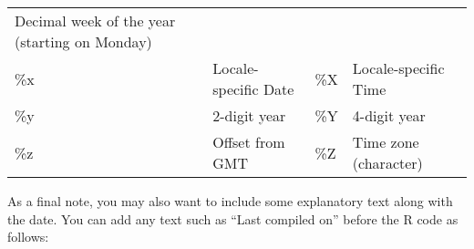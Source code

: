 \documentclass[
  11pt,
]{krantz}
\newenvironment{Shaded}{\begin{snugshade}}{\end{snugshade}}
\newcommand{\AttributeTok}[1]{\textcolor[rgb]{0.61,0.61,0.61}{#1}}
\newcommand{\FunctionTok}[1]{\textcolor[rgb]{0,0,0}{#1}}
\newcommand{\KeywordTok}[1]{\textcolor[rgb]{0.27,0.27,0.27}{\textbf{#1}}}
\newcommand{\StringTok}[1]{\textcolor[rgb]{0.5,0.5,0.5}{#1}}
\begin{document}
\begin{table}
\begin{tabular}{llll}
\begin{minipage}[t]{0.47\columnwidth}
Decimal week of the year (starting on Monday)\strut
\end{minipage}\tabularnewline
\begin{minipage}[t]{0.05\columnwidth}\raggedright
\%x\strut
\end{minipage} & \begin{minipage}[t]{0.31\columnwidth}\raggedright
Locale-specific Date\strut
\end{minipage} & \begin{minipage}[t]{0.05\columnwidth}\raggedright
\%X\strut
\end{minipage} & \begin{minipage}[t]{0.47\columnwidth}\raggedright
Locale-specific Time\strut
\end{minipage}\tabularnewline
\begin{minipage}[t]{0.05\columnwidth}\raggedright
\%y\strut
\end{minipage} & \begin{minipage}[t]{0.31\columnwidth}\raggedright
2-digit year\strut
\end{minipage} & \begin{minipage}[t]{0.05\columnwidth}\raggedright
\%Y\strut
\end{minipage} & \begin{minipage}[t]{0.47\columnwidth}\raggedright
4-digit year\strut
\end{minipage}\tabularnewline
\begin{minipage}[t]{0.05\columnwidth}\raggedright
\%z\strut
\end{minipage} & \begin{minipage}[t]{0.31\columnwidth}\raggedright
Offset from GMT\strut
\end{minipage} & \begin{minipage}[t]{0.05\columnwidth}\raggedright
\%Z\strut
\end{minipage} & \begin{minipage}[t]{0.47\columnwidth}\raggedright
Time zone (character)\strut
\end{minipage}\tabularnewline
\bottomrule
\end{tabular}
\end{table}

As a final note, you may also want to include some explanatory text along with the date. You can add any text such as ``Last compiled on'' before the R code as follows:

\begin{Shaded}
\end{Shaded}
\end{document}

